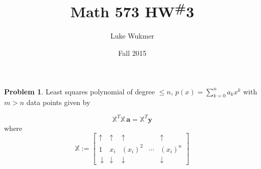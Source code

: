 \documentclass[10pt]{article}
\theoremstyle{plain}
\theoremstyle{definition}
\newtheorem{prob}{Problem}
\numberwithin{equation}{section}
\begin{document}
\title{Math 573 HW\textsuperscript{\#}3}
\author{Luke Wukmer}
\date{Fall 2015}
\maketitle \thispagestyle{empty} %

\begin{prob}
    Least squares polynomial of degree $\leq n$, $p(x) = \sum_{k=0}^n a_k x^k$
    with $m>n$ data points given by

    \[      \mathbb{X}^T\mathbb{X}\, \bm{a} = \mathbb{X}^T \bm{y}
    \]
    where \[
            \mathbb{X} := \begin{bmatrix}
                \uparrow & \uparrow & \uparrow &    & \uparrow \\
            1       & x_i & (x_i)^2 & \cdots & (x_i)^n      \\\
            \downarrow & \downarrow & \downarrow &  & \downarrow 
            \end{bmatrix}
\]


\end{prob}
\end{document}
